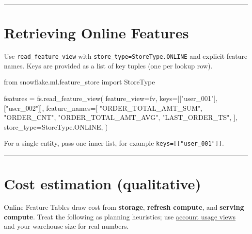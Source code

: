 \documentclass[
  letterpaper,
  DIV=11,
  numbers=noendperiod]{scrreprt}
\newenvironment{Shaded}{\begin{snugshade}}{\end{snugshade}}
\newcommand{\ImportTok}[1]{\textcolor[rgb]{0.00,0.46,0.62}{#1}}
\newcommand{\NormalTok}[1]{\textcolor[rgb]{0.00,0.23,0.31}{#1}}
\newcommand{\OperatorTok}[1]{\textcolor[rgb]{0.37,0.37,0.37}{#1}}
\newcommand{\StringTok}[1]{\textcolor[rgb]{0.13,0.47,0.30}{#1}}
\begin{document}
\begin{center}\rule{0.5\linewidth}{0.5pt}\end{center}

\hypertarget{retrieving-online-features}{%
\section{Retrieving Online Features}\label{retrieving-online-features}}

Use \texttt{read\_feature\_view} with
\texttt{store\_type=StoreType.ONLINE} and explicit feature names. Keys
are provided as a list of key tuples (one per lookup row).

\begin{Shaded}
\begin{Highlighting}[]
\ImportTok{from}\NormalTok{ snowflake.ml.feature\_store }\ImportTok{import}\NormalTok{ StoreType}

\NormalTok{features }\OperatorTok{=}\NormalTok{ fs.read\_feature\_view(}
\NormalTok{    feature\_view}\OperatorTok{=}\NormalTok{fv,}
\NormalTok{    keys}\OperatorTok{=}\NormalTok{[[}\StringTok{"user\_001"}\NormalTok{], [}\StringTok{"user\_002"}\NormalTok{]],}
\NormalTok{    feature\_names}\OperatorTok{=}\NormalTok{[}
        \StringTok{"ORDER\_TOTAL\_AMT\_SUM"}\NormalTok{,}
        \StringTok{"ORDER\_CNT"}\NormalTok{,}
        \StringTok{"ORDER\_TOTAL\_AMT\_AVG"}\NormalTok{,}
        \StringTok{"LAST\_ORDER\_TS"}\NormalTok{,}
\NormalTok{    ],}
\NormalTok{    store\_type}\OperatorTok{=}\NormalTok{StoreType.ONLINE,}
\NormalTok{)}
\end{Highlighting}
\end{Shaded}

For a single entity, pass one inner list, for example
\texttt{keys={[}{[}"user\_001"{]}{]}}.

\begin{center}\rule{0.5\linewidth}{0.5pt}\end{center}

\hypertarget{cost-estimation-qualitative}{%
\section{Cost estimation
(qualitative)}\label{cost-estimation-qualitative}}

Online Feature Tables draw cost from \textbf{storage}, \textbf{refresh
compute}, and \textbf{serving compute}. Treat the following as planning
heuristics; use
\href{https://docs.snowflake.com/en/developer-guide/snowflake-ml/feature-store/create-and-serve-online-features-python}{account
usage views} and your warehouse size for real numbers.
\end{document}
